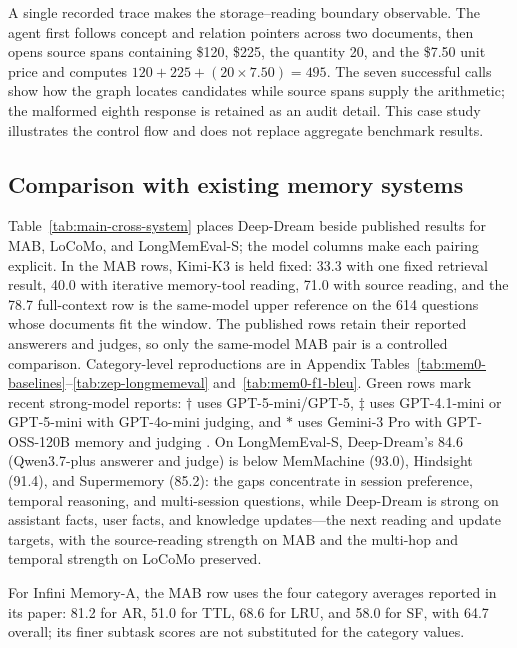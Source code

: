 



A single recorded trace makes the storage--reading boundary observable. The agent first follows concept and relation pointers across two documents, then opens source spans containing \$120, \$225, the quantity 20, and the \$7.50 unit price and computes $120+225+(20\times7.50)=495$. The seven successful calls show how the graph locates candidates while source spans supply the arithmetic; the malformed eighth response is retained as an audit detail. This case study illustrates the control flow and does not replace aggregate benchmark results.

\subsection{Comparison with existing memory systems}
\label{sec:cross-system}

Table~\ref{tab:main-cross-system} places Deep-Dream beside published results for MAB, LoCoMo, and LongMemEval-S; the model columns make each pairing explicit. In the MAB rows, Kimi-K3 is held fixed: 33.3 with one fixed retrieval result, 40.0 with iterative memory-tool reading, 71.0 with source reading, and the 78.7 full-context row is the same-model upper reference on the 614 questions whose documents fit the window. The published rows retain their reported answerers and judges, so only the same-model MAB pair is a controlled comparison. Category-level reproductions are in Appendix Tables~\ref{tab:mem0-baselines}--\ref{tab:zep-longmemeval} and~\ref{tab:mem0-f1-bleu}. Green rows mark recent strong-model reports: $\dagger$ uses GPT-5-mini/GPT-5, $\ddagger$ uses GPT-4.1-mini or GPT-5-mini with GPT-4o-mini judging, and $\ast$ uses Gemini-3 Pro with GPT-OSS-120B memory and judging \citep{ji2026infini,wang2026memmachine,latimer2025hindsight}. On LongMemEval-S, Deep-Dream's 84.6 (Qwen3.7-plus answerer and judge) is below MemMachine (93.0), Hindsight (91.4), and Supermemory (85.2): the gaps concentrate in session preference, temporal reasoning, and multi-session questions, while Deep-Dream is strong on assistant facts, user facts, and knowledge updates---the next reading and update targets, with the source-reading strength on MAB and the multi-hop and temporal strength on LoCoMo preserved.

For Infini Memory-A, the MAB row uses the four category averages reported in its paper: 81.2 for AR, 51.0 for TTL, 68.6 for LRU, and 58.0 for SF, with 64.7 overall; its finer subtask scores are not substituted for the category values.

